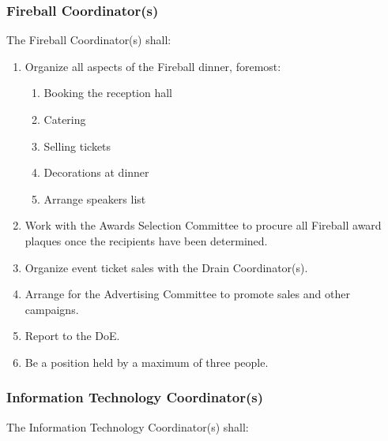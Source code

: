 \subsubsection{Fireball Coordinator(s)}
\label{fireball-coordinators}
The Fireball Coordinator(s) shall:

\begin{enumerate}
 \item
  Organize all aspects of the Fireball dinner, foremost:

  \begin{enumerate}
   \item
    Booking the reception hall
   \item
    Catering
   \item
    Selling tickets
   \item
    Decorations at dinner
   \item
    Arrange speakers list
  \end{enumerate}
 \item
  Work with the Awards Selection Committee to procure all Fireball award plaques once the recipients have been determined.
 \item
  Organize event ticket sales with the Drain Coordinator(s).
 \item
  Arrange for the Advertising Committee to promote sales and other campaigns.
 \item
  Report to the DoE.
 \item
  Be a position held by a maximum of three people.

\end{enumerate}

\subsubsection{Information Technology Coordinator(s)}
\label{information-technology-coordinators}
The Information Technology Coordinator(s) shall:

